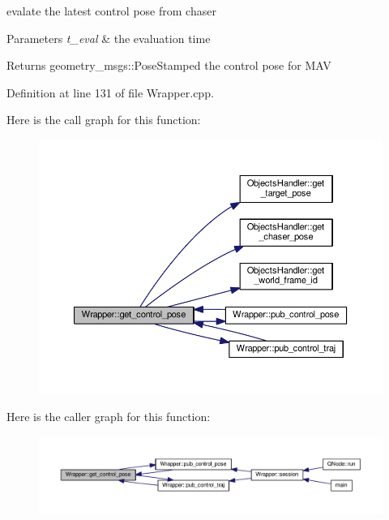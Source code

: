 evalate the latest control pose from chaser 


\begin{DoxyParams}{Parameters}
{\em t\+\_\+eval} & the evaluation time \\
\hline
\end{DoxyParams}
\begin{DoxyReturn}{Returns}
geometry\+\_\+msgs\+::\+Pose\+Stamped the control pose for M\+AV 
\end{DoxyReturn}


Definition at line 131 of file Wrapper.\+cpp.



Here is the call graph for this function\+:
\nopagebreak
\begin{figure}[H]
\begin{center}
\leavevmode
\includegraphics[width=350pt]{class_wrapper_ac2338df9e7b31f3291ed1cbd137a6f14_cgraph}
\end{center}
\end{figure}




Here is the caller graph for this function\+:
\nopagebreak
\begin{figure}[H]
\begin{center}
\leavevmode
\includegraphics[width=350pt]{class_wrapper_ac2338df9e7b31f3291ed1cbd137a6f14_icgraph}
\end{center}
\end{figure}


